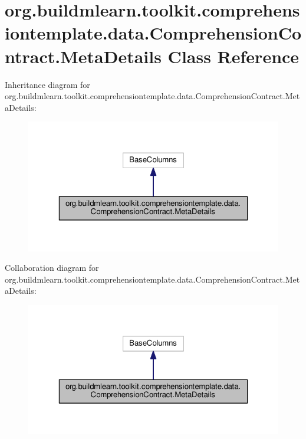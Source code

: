 \hypertarget{classorg_1_1buildmlearn_1_1toolkit_1_1comprehensiontemplate_1_1data_1_1ComprehensionContract_1_1MetaDetails}{}\section{org.\+buildmlearn.\+toolkit.\+comprehensiontemplate.\+data.\+Comprehension\+Contract.\+Meta\+Details Class Reference}
\label{classorg_1_1buildmlearn_1_1toolkit_1_1comprehensiontemplate_1_1data_1_1ComprehensionContract_1_1MetaDetails}


Inheritance diagram for org.\+buildmlearn.\+toolkit.\+comprehensiontemplate.\+data.\+Comprehension\+Contract.\+Meta\+Details\+:
\nopagebreak
\begin{figure}[H]
\begin{center}
\leavevmode
\includegraphics[width=323pt]{classorg_1_1buildmlearn_1_1toolkit_1_1comprehensiontemplate_1_1data_1_1ComprehensionContract_1_1MetaDetails__inherit__graph}
\end{center}
\end{figure}


Collaboration diagram for org.\+buildmlearn.\+toolkit.\+comprehensiontemplate.\+data.\+Comprehension\+Contract.\+Meta\+Details\+:
\nopagebreak
\begin{figure}[H]
\begin{center}
\leavevmode
\includegraphics[width=323pt]{classorg_1_1buildmlearn_1_1toolkit_1_1comprehensiontemplate_1_1data_1_1ComprehensionContract_1_1MetaDetails__coll__graph}
\end{center}
\end{figure}
